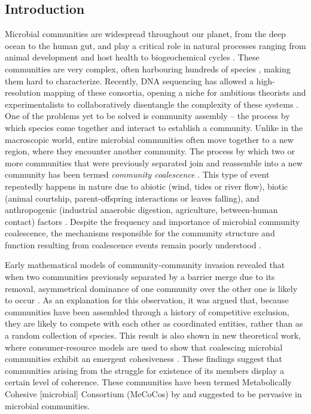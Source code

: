 \documentclass[titlepage,11pt]{article}
\begin{document}
	\begin{linenumbers}
		\section{Introduction}
		\hspace{15pt}Microbial communities are widespread throughout our planet, from the deep ocean to the human gut, and play a critical role in natural processes ranging from animal development and host health \citep{Huttenhower2012} to biogeochemical cycles \citep{Falkowski2008}. These communities are very complex, often harbouring hundreds of species \citep{Gilbert2014}, making them hard to characterize. Recently, DNA sequencing has allowed a high-resolution mapping of these consortia, opening a niche for ambitious theorists and experimentalists to collaboratively disentangle the complexity of these systems \citep{Marsland2019, Goldford2018, Goyal2018, Friedman2017, Costello2012, Vila2019}. One of the problems yet to be solved is community assembly -- the process by which species come together and interact to establish a community. Unlike in the macroscopic world, entire microbial communities often move together to a new region, where they encounter another community. The process by which two or more communities that were previously separated join and reassemble into a new community has been termed \textit{community coalescence} \citep{Rillig2015}. This type of event repeatedly happens in nature due to abiotic (wind, tides or river flow), biotic (animal courtship, parent-offspring interactions or leaves falling), and anthropogenic (industrial anaerobic digestion, agriculture, between-human contact) factors \citep{Castledine2020}. Despite the frequency and importance of microbial community coalescence, the mechanisms responsible for the community structure and function resulting from coalescence events remain poorly understood \citep{Rillig2016b}.\par
		Early mathematical models of community-community invasion revealed that when two communities previously separated by a barrier merge due to its removal, asymmetrical dominance of one community over the other one is likely to occur \citep{Gilpin1994, Toquenaga1997}. As an explanation for this observation, it was argued that, because communities have been assembled through a history of competitive exclusion, they are likely to compete with each other as coordinated entities, rather than as a random collection of species. This result is also shown in new theoretical work, where consumer-resource models are used to show that coalescing microbial communities exhibit an emergent cohesiveness \citep{Tikhonov2016, Tikhonov2017}. These findings suggest that communities arising from the struggle for existence of its members display a certain level of coherence. These communities have been termed Metabolically Cohesive [microbial] Consortium (MeCoCos) by \citet{Pascual-Garcia2020} and suggested to be pervasive in microbial communities.\par 

\end{linenumbers}
\end{document}
